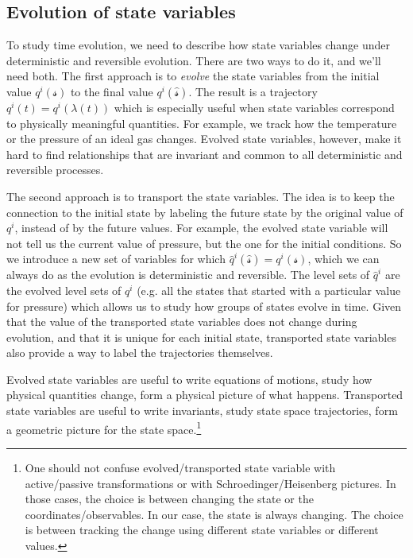 \documentclass[aps,pra,10pt,twocolumn,floatfix,nofootinbib]{revtex4-1}
\numberwithin{equation}{section}
\theoremstyle{definition}
\begin{document}
\subsection{Evolution of state variables}

To study time evolution, we need to describe how state variables change under deterministic and reversible evolution. There are two ways to do it, and we'll need both. The first approach is to \emph{evolve} the state variables from the initial value $q^i(\mathcal{s})$ to the final value $q^i(\hat{\mathcal{s}})$. The result is a trajectory $q^i(t)=q^i(\lambda(t))$ which is especially useful when state variables correspond to physically meaningful quantities. For example, we track how the temperature or the pressure of an ideal gas changes. Evolved state variables, however, make it hard to find relationships that are invariant and common to all deterministic and reversible processes.

The second approach is to transport the state variables. The idea is to keep the connection to the initial state by labeling the future state by the original value of $q^i$, instead of by the future values. For example, the evolved state variable will not tell us the current value of pressure, but the one for the initial conditions. So we introduce a new set of variables for which $\hat{q}^i(\hat{\mathcal{s}})=q^i(\mathcal{s})$, which we can always do as the evolution is deterministic and reversible. The level sets of $\hat{q}^i$ are the evolved level sets of $q^i$ (e.g. all the states that started with a particular value for pressure) which allows us to study how groups of states evolve in time. Given that the value of the transported state variables does not change during evolution, and that it is unique for each initial state, transported state variables also provide a way to label the trajectories themselves.

Evolved state variables are useful to write equations of motions, study how physical quantities change, form a physical picture of what happens. Transported state variables are useful to write invariants, study state space trajectories, form a geometric picture for the state space.\footnote{One should not confuse evolved/transported state variable with active/passive transformations or with Schroedinger/Heisenberg pictures. In those cases, the choice is between changing the state or the coordinates/observables. In our case, the state is always changing. The choice is between tracking the change using different state variables or different values.}
\end{document}
